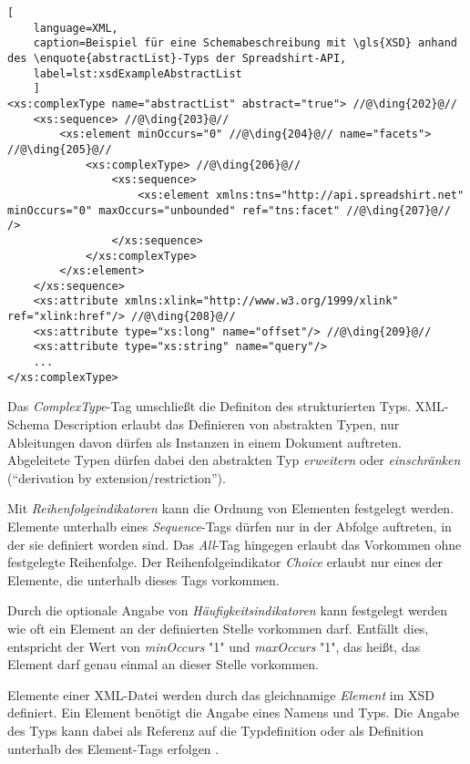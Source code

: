 \begin{lstlisting}[
    language=XML, 
    caption=Beispiel für eine Schemabeschreibung mit \gls{XSD} anhand des \enquote{abstractList}-Typs der Spreadshirt-API,
    label=lst:xsdExampleAbstractList
    ]
<xs:complexType name="abstractList" abstract="true"> //@\ding{202}@//
    <xs:sequence> //@\ding{203}@//
        <xs:element minOccurs="0" //@\ding{204}@// name="facets"> //@\ding{205}@//
            <xs:complexType> //@\ding{206}@//
                <xs:sequence>
                    <xs:element xmlns:tns="http://api.spreadshirt.net" minOccurs="0" maxOccurs="unbounded" ref="tns:facet" //@\ding{207}@// />
                </xs:sequence>
            </xs:complexType>
        </xs:element>
    </xs:sequence>
    <xs:attribute xmlns:xlink="http://www.w3.org/1999/xlink" ref="xlink:href"/> //@\ding{208}@//
    <xs:attribute type="xs:long" name="offset"/> //@\ding{209}@//
    <xs:attribute type="xs:string" name="query"/>        
    ...
</xs:complexType>
\end{lstlisting}

Das \emph{ComplexType}-Tag  umschließt die Definiton des strukturierten Typs. \gls{XML}-Schema Description erlaubt das Definieren von abstrakten Typen, nur Ableitungen davon dürfen als Instanzen in einem Dokument auftreten. Abgeleitete Typen dürfen dabei den abstrakten Typ \emph{erweitern} oder \emph{einschränken} (\enquote{derivation by extension/restriction}).

Mit \emph{Reihenfolgeindikatoren}  kann die Ordnung von Elementen festgelegt werden. Elemente unterhalb eines \emph{Sequence}-Tags dürfen nur in der Abfolge auftreten, in der sie definiert worden sind. Das \emph{All}-Tag  hingegen erlaubt das Vorkommen ohne festgelegte Reihenfolge. Der Reihenfolgeindikator \emph{Choice} erlaubt nur eines der Elemente, die unterhalb dieses Tags vorkommen.

Durch die optionale Angabe von \emph{Häufigkeitsindikatoren}  kann festgelegt werden wie oft ein Element an der definierten Stelle vorkommen darf. Entfällt dies, entspricht der Wert von \emph{minOccurs} "1" und \emph{maxOccurs} "1", das heißt, das Element darf genau einmal an dieser Stelle vorkommen.

Elemente einer \gls{XML}-Datei werden durch das gleichnamige \emph{Element}  im \gls{XSD} definiert. Ein Element benötigt die Angabe eines Namens und Typs. Die Angabe des Typs kann dabei als Referenz auf die Typdefinition  oder als Definition unterhalb des Element-Tags erfolgen .

